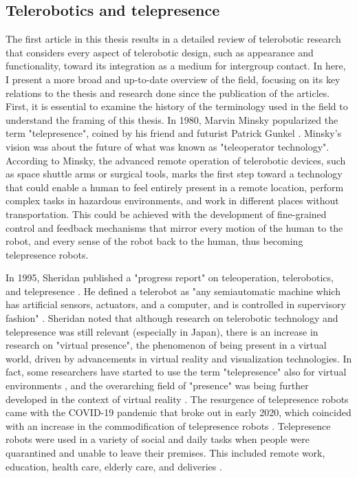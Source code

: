 \documentclass[dissertation,math,vertlayout,pdfa,colorlinks]{aaltoseries}
\begin{document}
\subsection{Telerobotics and telepresence}
The first article in this thesis results in a detailed review of telerobotic research that considers every aspect of telerobotic design, such as appearance and functionality, toward its integration as a medium for intergroup contact. In here, I present a more broad and up-to-date overview of the field, focusing on its key relations to the thesis and research done since the publication of the articles. First, it is essential to examine the history of the terminology used in the field to understand the framing of this thesis. In 1980, Marvin Minsky popularized the term "telepresence", coined by his friend and futurist Patrick Gunkel \cite{minskyTelepresence1980}. Minsky's vision was about the future of what was known as "teleoperator technology". According to Minsky, the advanced remote operation of telerobotic devices, such as space shuttle arms or surgical tools, marks the first step toward a technology that could enable a human to feel entirely present in a remote location, perform complex tasks in hazardous environments, and work in different places without transportation. This could be achieved with the development of fine-grained control and feedback mechanisms that mirror every motion of the human to the robot, and every sense of the robot back to the human, thus becoming telepresence robots.

In 1995, Sheridan published a "progress report" on teleoperation, telerobotics, and telepresence \cite{sheridanTeleoperationTeleroboticsTelepresence1995}. He defined a telerobot as "any semiautomatic machine which has artificial sensors, actuators, and a computer, and is controlled in supervisory fashion" \cite[p. 205]{sheridanTeleoperationTeleroboticsTelepresence1995}. Sheridan noted that although research on telerobotic technology and telepresence was still relevant (especially in Japan), there is an increase in research on "virtual presence", the phenomenon of being present in a virtual world, driven by advancements in virtual reality and visualization technologies. In fact, some researchers have started to use the term "telepresence" also for virtual environments \cite{steuerDefiningVirtualReality1992}, and the overarching field of "presence" was being further developed in the context of virtual reality \cite{slaterInfluenceBodyMovement1998}. The resurgence of telepresence robots came with the COVID-19 pandemic that broke out in early 2020, which coincided with an increase in the commodification of telepresence robots \cite{shenRobotsCOVID19Pandemic2021}. Telepresence robots were used in a variety of social and daily tasks when people were quarantined and unable to leave their premises. This included remote work, education, health care, elderly care, and deliveries \cite{shenRobotsCOVID19Pandemic2021}. 
\end{document}
